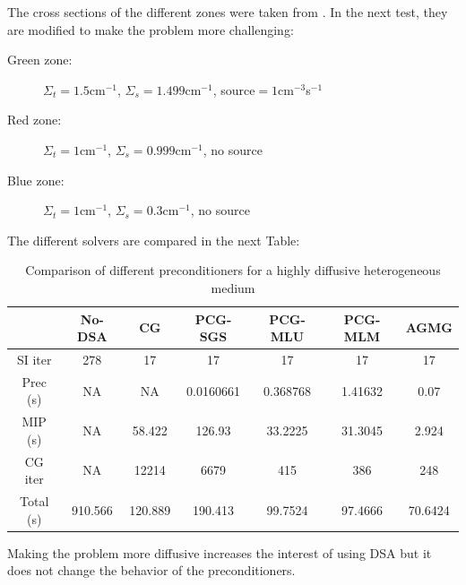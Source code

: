 The cross sections of the different zones were taken from \cite{mip}. In the
next test, they are modified to make the problem more challenging:
\begin{description}
  \item[Green zone:] $\Sigma_t =1.5$cm$^{-1}$, $\Sigma_s = 1.499$cm$^{-1}$, source$ =
    1$cm$^{-3}$s$^{-1}$
  \item[Red zone:] $\Sigma_t = 1$cm$^{-1}$, $\Sigma_s = 0.999$cm$^{-1}$, no source
  \item[Blue zone:] $\Sigma_t = 1$cm$^{-1}$, $\Sigma_s = 0.3$cm$^{-1}$, no source
\end{description}
The different solvers are compared in the next Table:
\begin{table}[H]
  \begin{center}
    \caption{Comparison of different preconditioners for a highly diffusive 
    heterogeneous medium}
    \begin{tabular}{|c|c|c|c|c|c|c|}
      \hline
      & No-DSA & CG & PCG-SGS & PCG-MLU & PCG-MLM & AGMG\\
      \hline
      SI iter   & 278     & 17      & 17        & 17       & 17      & 17 \\
      Prec (s)  & NA      & NA      & 0.0160661 & 0.368768 & 1.41632 & 0.07 \\
      MIP (s)   & NA      & 58.422  & 126.93    & 33.2225  & 31.3045 & 2.924 \\
      CG iter   & NA      & 12214   & 6679      & 415      & 386     & 248 \\
      Total (s) & 910.566 & 120.889 & 190.413   & 99.7524  & 97.4666 & 70.6424 \\
      \hline
    \end{tabular}
  \end{center}
\end{table}
Making the problem more diffusive increases the interest of using DSA but it
does not change the behavior of the preconditioners.

